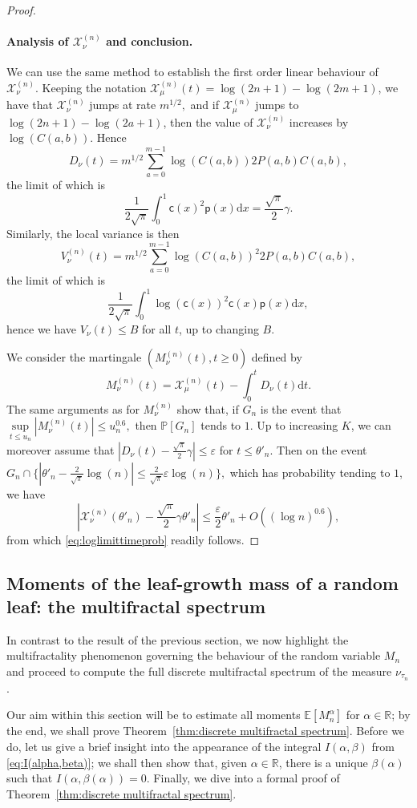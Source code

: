 \documentclass[11pt]{article}
\newcommand{\Xmun}{\mathcal{X}^{(n)}_{\mu}}
\newcommand{\Xnun}{\mathcal{X}^{(n)}_{\nu}}
\newcommand{\pp}{\mathsf{p}}
\newcommand{\cc}{\mathsf{c}}
\newcommand{\ff}{\cc}
\newcommand{\E}{\mathbb{E}}
\newcommand{\R}{{\mathbb{R}}}
\newcommand{\veps}{\varepsilon}
\newcommand{\pr}{\mathbb{P}}
\renewcommand{\geq}{\geqslant}
\renewcommand{\leq}{\leqslant}
\newcommand{\dd}{\mathrm{d}}
\begin{document}
\begin{proof}
\paragraph{Analysis of $\Xnun$ and conclusion.}
We can use the same method to establish the first order linear behaviour of $\Xnun$. Keeping the notation $\Xmun(t)=\log (2n+1) - \log (2m+1)$, we have that $\Xnun$ jumps at rate $m^{1/2},$ and if $\Xmun$ jumps to $\log (2n+1) - \log (2a+1)$, then the value of $\Xnun$ increases by $\log(C(a,b))$. Hence
\[ D_{\nu}(t)=m^{1/2}\sum_{a=0}^{m-1} \log (C(a,b)) 2P(a,b)C(a,b), \]
the limit of which is
\[\frac1{2\sqrt{\pi}}\int_{0}^1 \ff(x)^2\pp(x)\dd x=\frac{\sqrt{\pi}}{2}\gamma.\]
Similarly, the local variance is then
\[ V_{\nu}^{(n)}(t)=m^{1/2}\sum_{a=0}^{m-1} \log(C(a,b))^2 2P(a,b)C(a,b), \]
the limit of which is
\[\frac1{2\sqrt{\pi}}\int_{0}^1 \log(\ff(x))^2\ff(x)\pp(x)\dd x,\]
hence we have $V_{\nu}(t)\leq B$ for all $t$, up to changing $B.$

We consider the martingale $(M^{(n)}_{\nu}(t),t\geq 0)$ defined by 
\[M^{(n)}_{\nu}(t)=\Xmun(t)-\int_0^t D_{\nu}(t)\mathrm dt.\]
The same arguments as for $M^{(n)}_{\nu}$ show that, if $G_n$ is the event that $\underset{t\leq u_n}\sup |M^{(n)}_{\nu}(t)| \leq u_n^{0.6},$ then $\pr[G_n]$ tends to $1$. Up to increasing $K$, we can moreover assume that $|D_{\nu}(t)-\frac{\sqrt{\pi}}{2}\gamma|\leq \veps$ for $t\leq \theta'_n.$ Then on the event $G_n\cap\{|\theta'_n-\frac{2}{\sqrt{\pi}}\log(n)|\leq \frac{2}{\sqrt{\pi}}\veps\log(n)\},$ which has probability tending to $1$, we have
\[|\Xnun(\theta'_n)-\frac{\sqrt{\pi}}{2}\gamma\theta'_n|\leq \frac{\veps}{2}\theta'_n+O((\log n)^{0.6}),\]
from which \eqref{eq:loglimittimeprob} readily follows.
\end{proof}


\subsection{Moments of the leaf-growth mass of a random leaf: the multifractal spectrum}\label{section:multifractal spectrum}
In contrast to the result of the previous section, we now highlight the multifractality phenomenon governing the behaviour of the random variable $M_n$ and proceed to compute the full discrete multifractal spectrum of the measure $\nu_{\tau_n}$.

Our aim within this section will be to estimate all moments $\E[M_n^\alpha]$ for $\alpha\in\R$; by the end, we shall prove Theorem~\ref{thm:discrete multifractal spectrum}. Before we do, let us give a brief insight into the appearance of the integral $I(\alpha,\beta)$ from \eqref{eq:I(alpha,beta)}; we shall then show that, given $\alpha\in\R$, there is a unique $\beta(\alpha)$ such that $I(\alpha,\beta(\alpha))=0$. Finally, we dive into a formal proof of Theorem~\ref{thm:discrete multifractal spectrum}.
\end{document}
